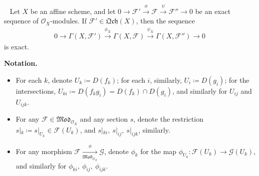 \documentclass[11pt,a4paper,footinclude=true,headinclude=true]{scrbook} %
\newcommand{\FF}{\mathscr{F}}
\newcommand{\GG}{\mathscr{G}}
\newcommand{\OO}{\mathcal{O}}
\newcommand{\<}{\langle}
\newcommand{\>}{\rangle}
\newcommand{\MOD}{\mathfrak{Mod}}
\newcommand{\qcoh}{\mathfrak{Qch}}
\newenvironment{proposition}[2][]
{\renewcommand\theinnercustomprop{#2}\innercustomprop[#1] 
\begin{mdframed}[backgroundcolor=gray!20]\ }
{\end{mdframed}\endinnercustomprop}
\newenvironment{notation}[2][Notation]
    { \begin{mdframed}[backgroundcolor=gray!20] \textbf{#1.} }
    {  \end{mdframed}}
\begin{document}
\begin{proposition}{5.6}
    Let $X$ be an affine scheme, and let $0\to\FF'\xrightarrow{\phi}\FF\xrightarrow{\psi}\FF''\to0$ be an exact sequence of $\OO_X$-modules. If $\FF'\in\qcoh(X)$, then the sequence
    \begin{align*}
        0\longrightarrow\Gamma(X,\FF')\xrightarrow{\phi_X}\Gamma(X,\FF)\xrightarrow{\psi_X}\Gamma(X,\FF'')\longrightarrow0
    \end{align*}
    is exact.
\end{proposition}
\begin{notation}\mbox{}
    \begin{itemize}
        \item For each $k$, denote $U_k\coloneqq D(f_k)$; for each $i$, similarly, $U_i\coloneqq D(g_i)$; for the intersections, $U_{ki}\coloneqq D(f_kg_i)=D(f_k)\cap D(g_i)$, and similarly for $U_{ij}$ and $U_{ijk}$.
        \item For any $\FF\in\MOD_{\OO_X}$ and any section $s$, denote the restriction $s|_k\coloneqq s|_{U_k}\in\FF(U_k)$, and $s|_{ki},\ s|_{ij},\ s|_{ijk}$, similarly. 
        \item For any morphism $\FF\xrightarrow[\MOD_{\OO_X}]{\phi}\GG$, denote $\phi_k$ for the map $\phi_{U_k}:\FF(U_k)\to\GG(U_k)$, and similarly for $\phi_{ki},\ \phi_{ij},\ \phi_{ijk}$.
    \end{itemize}
\end{notation}
\end{document}
